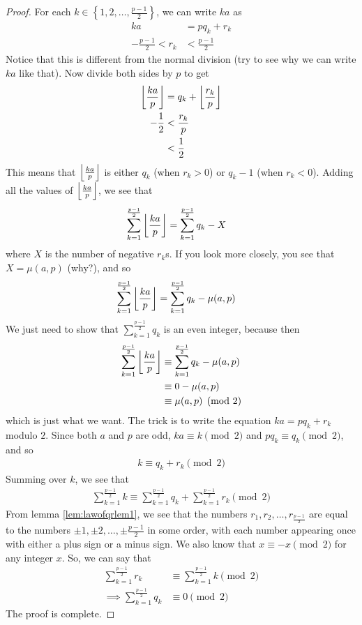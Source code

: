 \begin{proof}
	For each $k \in \left\{1, 2, \dots, \frac{p-1}{2} \right\}$, we can write $ka$ as
	\begin{align*}
		ka
			& = pq_k + r_k\\
		-\frac{p-1}{2}<r_k
			& < \frac{p-1}{2}
	\end{align*}
	Notice that this is different from the normal division (try to see why we can write $ka$ like that). Now divide both sides by $p$ to get
		\begin{align*}
			\left\lfloor{\frac{ka}{p}}\right\rfloor
				& = q_k + \left\lfloor{\frac{r_k}{p}}\right\rfloor\\
			-\frac{1}{2}
				& <\frac{r_k}{p}\\
				& < \frac{1}{2}
		\end{align*}
	This means that $\left\lfloor{\frac{ka}{p}}\right\rfloor$ is either $q_k$ (when $r_k >0$) or $q_k -1$ (when $r_k<0$). Adding all the values of $\left\lfloor{\frac{ka}{p}}\right\rfloor$, we see that
	\begin{align*}
		\sum_{k=1}^{\frac{p-1}{2}} \left\lfloor{\frac{ka}{p}}\right\rfloor
			& = \sum_{k=1}^{\frac{p-1}{2}} q_k - X
	\end{align*}
	where $X$ is the number of negative $r_k$s. If you look more closely, you see that $X= \mu(a,p)$ (why?), and so
	\begin{align*}
	\sum_{k=1}^{\frac{p-1}{2}} \left\lfloor{\frac{ka}{p}}\right\rfloor
		& = \sum_{k=1}^{\frac{p-1}{2}} q_k - \mu(a,p)
	\end{align*}
	We just need to show that $\sum_{k=1}^{\frac{p-1}{2}} q_k$ is an even integer, because then
	\begin{align*}
		\sum_{k=1}^{\frac{p-1}{2}} \left\lfloor{\frac{ka}{p}}\right\rfloor
			& \equiv \sum_{k=1}^{\frac{p-1}{2}} q_k - \mu(a,p)\\
			& \equiv 0 -  \mu(a,p)\\
			& \equiv  \mu(a,p) \pmod 2
	\end{align*}
	which is just what we want. The trick is to write the equation $ka = pq_k + r_k$ modulo $2$. Since both $a$ and $p$ are odd, $ka \equiv k \pmod 2$ and $pq_k \equiv q_k \pmod 2$, and so
	\begin{align*}
		k \equiv q_k + r_k \pmod 2
	\end{align*}
	Summing over $k$, we see that
	\begin{align*}
		\sum_{k=1}^{\frac{p-1}{2}}k \equiv \sum_{k=1}^{\frac{p-1}{2}} q_k + \sum_{k=1}^{\frac{p-1}{2}} r_k \pmod 2
	\end{align*}
	From lemma \eqref{lem:lawofqrlem1}, we see that the numbers $r_1, r_2, \ldots, r_{\frac{p-1}{2}}$ are equal to the numbers $\pm 1, \pm 2, \ldots, \pm \frac{p-1}{2}$ in some order, with each number appearing once with either a plus sign or a minus sign. We also know that $x \equiv -x \pmod 2$ for any integer $x$. So, we can say that
	\begin{align*}
		\sum_{k=1}^{\frac{p-1}{2}} r_k
			& \equiv \sum_{k=1}^{\frac{p-1}{2}}k \pmod 2\\
		\implies \sum_{k=1}^{\frac{p-1}{2}} q_k
			& \equiv 0 \pmod 2
	\end{align*}
	The proof is complete.
\end{proof}

